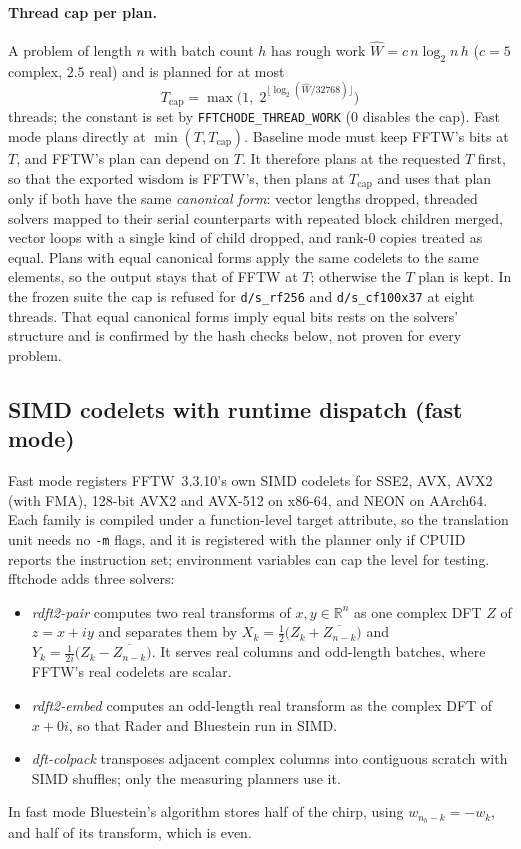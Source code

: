 \documentclass[10pt]{article}
\theoremstyle{definition}
\begin{document}
\paragraph{Thread cap per plan.} A problem of length $n$ with batch count $h$ has rough work $\widehat W=c\,n\log_2 n\,h$ ($c=5$ complex, $2.5$ real) and is planned for at most
\begin{equation}\label{eq:cap}
T_{\text{cap}}=\max\!\big(1,\;2^{\lfloor\log_2(\widehat W/32768)\rfloor}\big)
\end{equation}
threads; the constant is set by \texttt{FFTCHODE\_THREAD\_WORK} (0 disables the cap). Fast mode plans directly at $\min(T,T_{\text{cap}})$. Baseline mode must keep FFTW's bits at $T$, and FFTW's plan can depend on $T$. It therefore plans at the requested $T$ first, so that the exported wisdom is FFTW's, then plans at $T_{\text{cap}}$ and uses that plan only if both have the same \emph{canonical form}: vector lengths dropped, threaded solvers mapped to their serial counterparts with repeated block children merged, vector loops with a single kind of child dropped, and rank-0 copies treated as equal. Plans with equal canonical forms apply the same codelets to the same elements, so the output stays that of FFTW at $T$; otherwise the $T$ plan is kept. In the frozen suite the cap is refused for \texttt{d/s\_rf256} and \texttt{d/s\_cf100x37} at eight threads. That equal canonical forms imply equal bits rests on the solvers' structure and is confirmed by the hash checks below, not proven for every problem.

\subsection{SIMD codelets with runtime dispatch (fast mode)}\label{sec:simd}

Fast mode registers FFTW~3.3.10's own SIMD codelets for SSE2, AVX, AVX2 (with FMA), 128-bit AVX2 and AVX-512 on x86-64, and NEON on AArch64. Each family is compiled under a function-level target attribute, so the translation unit needs no \texttt{-m} flags, and it is registered with the planner only if CPUID reports the instruction set; environment variables can cap the level for testing. fftchode adds three solvers:
\begin{itemize}
\item \emph{rdft2-pair} computes two real transforms of $x,y\in\mathbb{R}^n$ as one complex DFT $Z$ of $z=x+iy$ and separates them by
$X_k=\tfrac12\big(Z_k+\overline{Z_{n-k}}\big)$ and $Y_k=\tfrac{1}{2i}\big(Z_k-\overline{Z_{n-k}}\big)$. It serves real columns and odd-length batches, where FFTW's real codelets are scalar.
\item \emph{rdft2-embed} computes an odd-length real transform as the complex DFT of $x+0i$, so that Rader and Bluestein run in SIMD.
\item \emph{dft-colpack} transposes adjacent complex columns into contiguous scratch with SIMD shuffles; only the measuring planners use it.
\end{itemize}
In fast mode Bluestein's algorithm stores half of the chirp, using $w_{n_b-k}=-w_k$, and half of its transform, which is even.
\end{document}
